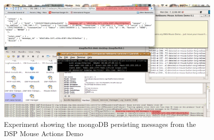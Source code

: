 

\begin{figure}[h]
  \centering
  \includegraphics[scale=0.4]{../diagrams/experiment-mouseactions-dsp}
  \caption{Experiment showing the mongoDB persisting messages from the DSP
  Mouse Actions Demo}
  \label{fig:experiment-mouseactions-dsp}
\end{figure}